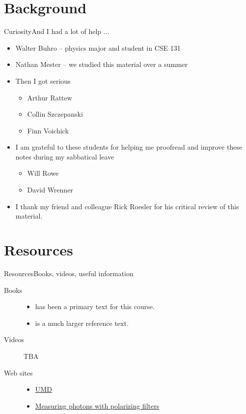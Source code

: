 \section{Background}
\begin{frame}{Curiosity}{And I had a lot of help $\ldots$}
\begin{itemize}
    \item Walter Buhro -- physics major and student in CSE 131
    \item Nathan Mester -- we studied this material over a summer
    \item Then I got serious
    \begin{itemize}
        \item Arthur Rattew
        \item Collin Szczepanski
        \item Finn Voichick
    \end{itemize}
    \item I am grateful to these students for helping me proofread and improve these notes during my sabbatical leave
    \begin{itemize}
        \item Will Rowe
        \item David Wrenner
    \end{itemize}
    \item I thank my friend and colleague Rick Roesler for his critical review of this material.
\end{itemize}
    
\end{frame}

\section*{Resources}
\begin{frame}{Resources}{Books, videos, useful information}
\begin{description}
    \item[Books]
    \begin{itemize}
        \item \Kaye{} has been a primary text for this course.
        \item \MikeIke{} is a much larger reference text.
    \end{itemize}
    \item[Videos] TBA
    \item[Web sites]
    \begin{itemize}
        \item \href{https://quantumatlas.umd.edu/}{UMD}
        \item \href{https://quantumatlas.umd.edu/gallery/MeasuringPolarization}{Measuring photons with polarizing filters}
    \end{itemize}
    
\end{description}
\end{frame}

